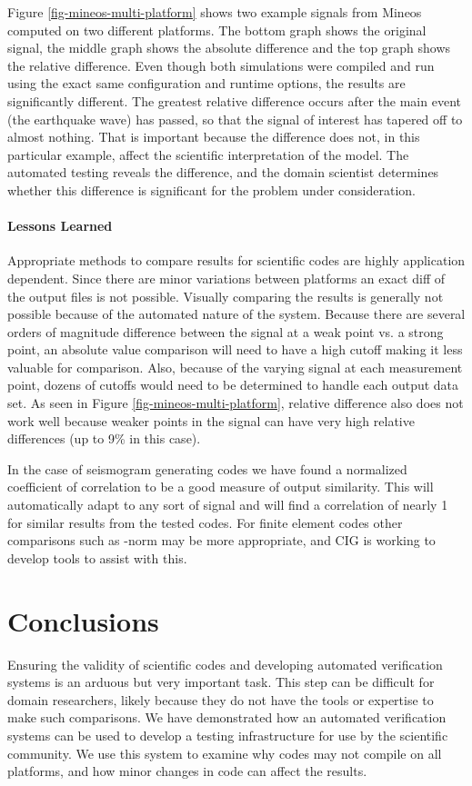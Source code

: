 \documentclass{acm_proc_article-sp}
\begin{document}
Figure \ref{fig-mineos-multi-platform} shows two example signals from Mineos computed on two different platforms.  The bottom graph shows the original signal, the middle graph shows the absolute difference and the top graph shows the relative difference.  Even though both simulations were compiled and run using the exact same configuration and runtime options, the results are significantly different.  The greatest relative difference occurs after the main event (the earthquake wave) has passed, so that the signal of interest has tapered off to almost nothing. That is important because the difference does not, in this particular example, affect the scientific interpretation of the model. The automated testing reveals the difference, and the domain scientist determines whether this difference is significant for the problem under consideration.

\paragraph*{Lessons Learned}
Appropriate methods to compare results for scientific codes are highly application dependent. Since there are minor variations between platforms an exact diff of the output files is not possible. Visually comparing the results is generally not possible because of the automated nature of the system.  Because there are several orders of magnitude difference between the signal at a weak point vs. a strong point, an absolute value comparison will need to have a high cutoff making it less valuable for comparison.  Also, because of the varying signal at each measurement point, dozens of cutoffs would need to be determined to handle each output data set.  As seen in Figure \ref{fig-mineos-multi-platform}, relative difference also does not work well because weaker points in the signal can have very high relative differences (up to 9\% in this case).

In the case of seismogram generating codes we have found a normalized coefficient of correlation to be a good measure of output similarity.  This will automatically adapt to any sort of signal and will find a correlation of nearly 1 for similar results from the tested codes.  For finite element codes other comparisons such as -norm may be more appropriate, and CIG is working to develop tools to assist with this. 

\section{Conclusions}
\label{sec-conclusions}
Ensuring the validity of scientific codes and developing automated verification systems is an arduous but very important task. This step can be difficult for domain researchers, likely because they do not have the tools or expertise to make such comparisons. We have demonstrated how an automated verification systems can be used to develop a testing infrastructure for use by the scientific community. We use this system to examine why codes may not compile on all platforms, and how minor changes in code can affect the results.



\end{document}
